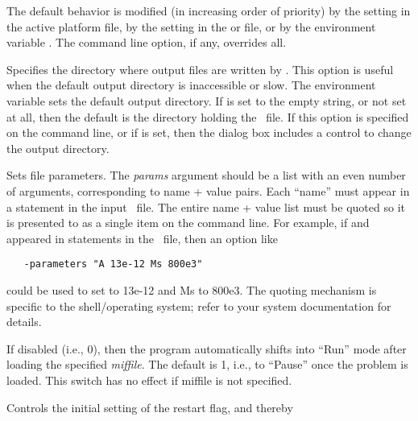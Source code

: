 \begin{description}
  The default behavior is modified (in increasing order of priority) by the
   setting in the active  platform
  file, by the  setting in the 
  or  file, or by the environment variable
  .  The
   command line option, if any, overrides all.
\item[\optkey{-outdir dir}]
  Specifies the directory where output files are written by
  .  This option is useful when the default output
  directory is inaccessible or slow. The environment variable
   sets the
  default output directory.  If  is set to the empty
  string, or not set at all, then the default is the directory holding
  the \MIF\ file.  If this option is specified on the command line, or
  if  is set, then the 
   dialog box includes a control to change
  the output directory.
\item[\optkey{-parameters params}]
  Sets  file
  parameters.  The \textit{params} argument should be a list with an
  even number of arguments, corresponding to name + value pairs.  Each
  ``name'' must appear in a
  statement in the input
  \MIF\ file.  The entire name + value list must be quoted so it is
  presented to  as a single item on the command line.  For
  example, if  and  appeared in  statements
  in the \MIF\ file, then an option like
\begin{verbatim}
   -parameters "A 13e-12 Ms 800e3"
\end{verbatim}
  could be used to set  to 13e-12 and Ms to 800e3.  The quoting
  mechanism is specific to the shell/operating system; refer to your system
  documentation for details.
\item[\optkey{-pause \boa 0\pipe 1\bca}]
  If disabled (i.e., 0), then the program automatically shifts into
  ``Run'' mode after loading the specified \textit{miffile}. The default
  is 1, i.e., to ``Pause'' once the problem is loaded. This switch has
  no effect if miffile is not specified.
\item[\optkey{-restart \boa 0\pipe 1\bca\index{simulation~3D!restarting}}]
  Controls the initial setting of the restart flag, and thereby

\end{description}
